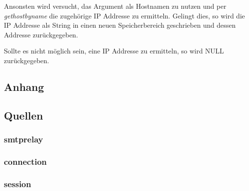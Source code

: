 \documentclass[pdftex,final,a4paper,10pt,notitlepage,halfparskip]{scrreprt}
\begin{document}
Ansonsten wird versucht, das Argument als Hostnamen zu nutzen und per \textit{gethostbyname} die zugehörige IP Addresse zu ermitteln. Gelingt dies, so wird die IP Addresse als String in einen neuen Speicherbereich geschrieben und dessen Addresse zurückgegeben.

Sollte es nicht möglich sein, eine IP Addresse zu ermitteln, so wird NULL zurückgegeben.




\begin{appendix}
  \chapter{Anhang}
  \section{Quellen}



  \subsection{smtprelay}
  
  \pagebreak
  
  \pagebreak
  \subsection{connection}
  
  \pagebreak
  
  \pagebreak
  \subsection{session}
  
  \pagebreak
  
  \pagebreak

\end{appendix}
\end{document}
